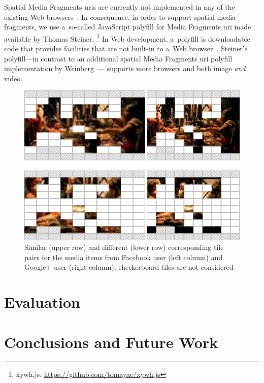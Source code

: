 \documentclass{article}
\begin{document}
Spatial Media Fragments {\sc uri}s are currently not implemented
in any of the existing Web browsers~\cite{weinberg2013polyfill}.
In consequence, in order to support spatial media fragments,
we use a~so-called JavaScript polyfill for Media Fragments {\sc uri}
made available by Thomas Steiner.%
\footnote{xywh.js: \url{https://github.com/tomayac/xywh.js}}
In Web development, a~polyfill is downloadable code
that provides facilities that are not built-in to a~Web browser~\cite{sharp2010polyfill}.
Steiner's polyfill---in contrast to an additional spatial Media Fragments {\sc uri}
polyfill implementation by Weinberg~\cite{weinberg2013polyfill}---%
supports more browsers and both image \emph{and} video.

\begin{figure}[b!]
  \centering
  \includegraphics[width=0.75\linewidth]{./similar-different.png}
  \caption{Similar (upper row) and different (lower row) corresponding tile pairs for the media items from Facebook user (left column) and Google+ user (right column); checkerboard tiles are not considered}
  \label{fig:similar-different}
\end{figure}

\section{Evaluation}
\label{sec:evaluation}

\section{Conclusions and Future Work}
\label{sec:conclusions-and-future-work}



\end{document}

